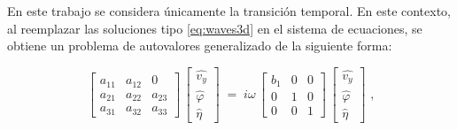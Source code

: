
En este trabajo se considera únicamente la transición temporal. En este contexto, al reemplazar las soluciones tipo \ref{eq:waves3d} en el sistema de ecuaciones, se obtiene un problema de autovalores generalizado de la siguiente forma:

%
%



\begin{equation}
\begin{bmatrix}
a_{11} & a_{12} & 0 \\[4pt]
a_{21} & a_{22} & a_{23} \\[4pt]
a_{31} & a_{32} & a_{33}
\end{bmatrix}
\,\begin{bmatrix}
\widehat{v_y} \\[4pt]
\widehat{\varphi} \\[4pt]
\widehat{\eta}
\end{bmatrix}
\;=\; i \omega
\,\begin{bmatrix}
  b_1 & 0 & 0 \\[4pt]
    0 & 1 & 0 \\[4pt]
    0 & 0 & 1
\end{bmatrix}
\,\begin{bmatrix}
\widehat{v_y} \\[4pt]
\widehat{\varphi} \\[4pt]
\widehat{\eta}
\end{bmatrix} \text{ ,}
\label{eq:eigensistem-general}
\end{equation}

